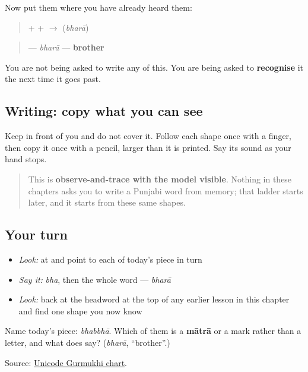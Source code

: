 Now put them where you have already heard them:

\begin{quote}
\textbf{} + \textbf{} + \textbf{} $\to$ \textbf{} (\emph{bharā})
\end{quote}

\begin{quote}
\textbf{} — \emph{bharā} — \textbf{brother}
\end{quote}

You are not being asked to write any of this. You are being asked to \textbf{recognise} it the next time it goes past.

\subsection*{Writing: copy what you can see}

Keep  in front of you and do not cover it. Follow each shape once with a finger, then copy it once with a pencil, larger than it is printed. Say its sound as your hand stops.

\begin{quote}
This is \textbf{observe-and-trace with the model visible}. Nothing in these chapters asks you to write a Punjabi word from memory; that ladder starts later, and it starts from these same shapes.
\end{quote}

\subsection*{Your turn}
\begin{itemize}
\raggedright
  \item \emph{Look:} at \textbf{} and point to each of today's piece in turn
  \item \emph{Say it:} \emph{bha}, then the whole word — \emph{bharā}
  \item \emph{Look:} back at the headword at the top of any earlier lesson in this chapter and find one shape you now know
\end{itemize}

\begin{tcolorbox}[breakable,colback=teal!4,colframe=teal!35!black,title={Before you move on}]
Name today's piece: \emph{bhabbhā}. Which of them is a \textbf{mātrā} or a mark rather than a letter, and what does \textbf{} say? (\emph{bharā}, “brother”.)

Source: \href{https://www.unicode.org/charts/PDF/U0A00.pdf}{Unicode Gurmukhi chart}.
\end{tcolorbox}
